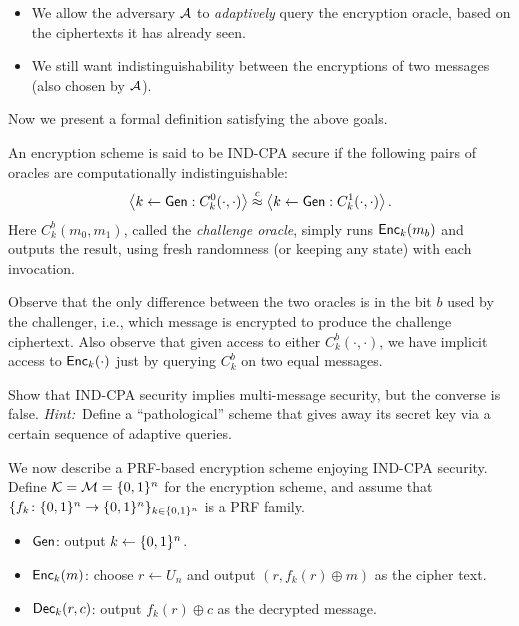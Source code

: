 \documentclass[11pt]{article}
\begin{document}
\begin{itemize}
\item We allow the adversary $\mathcal{A}$ to \emph{adaptively} query the
  encryption oracle, based on the ciphertexts it has already seen.
\item We still want indistinguishability between the encryptions of
  two messages (also chosen by $\mathcal{A}$).
\end{itemize}

Now we present a formal definition satisfying the above goals.

\begin{definition}
  \label{def:ind-cpa}
  An encryption scheme is said to be IND-CPA secure if the following
  pairs of oracles are computationally indistinguishable:
  \[ \left\langle k \gets \mathsf{Gen} : C^0_k(\cdot, \cdot) \right\rangle
  \stackrel{c}{\approx} \left\langle k \gets \mathsf{Gen} : C^1_k(\cdot, \cdot)
  \right\rangle. \] Here $C^{b}_{k}(m_{0}, m_{1})$, called the
  \emph{challenge oracle}, simply runs $\mathsf{Enc}_{k}(m_{b})$ and
  outputs the result, using fresh randomness (or keeping any state)
  with each invocation.
\end{definition}

Observe that the only difference between the two oracles is in the bit
$b$ used by the challenger, i.e., which message is encrypted to
produce the challenge ciphertext.  Also observe that given access to
either $C^{b}_{k}(\cdot,\cdot)$, we have implicit access to
$\mathsf{Enc}_{k}(\cdot)$ just by querying $C^{b}_{k}$ on two equal
messages.

\begin{question}
  Show that IND-CPA security implies multi-message security, but the
  converse is false.  \textit{Hint:}~Define a ``pathological'' scheme
  that gives away its secret key via a certain sequence of adaptive
  queries.
\end{question}

We now describe a PRF-based encryption scheme enjoying IND-CPA
security.  Define $\mathcal{K} = \mathcal{M} = \{0,1\}^{n}$ for the
encryption scheme, and assume that $\{f_{k} \colon \{0,1\}^{n} \to
  \{0,1\}^{n}\}_{k \in \{0,1\}^{n}}$ is a PRF family.
\begin{itemize}
\item $\mathsf{Gen}$: output $k \gets \{0,1\}^n$.
\item $\mathsf{Enc}_k(m)$: choose $r \gets U_n$ and output $(r, f_k(r)
  \oplus m)$ as the cipher text.
\item $\mathsf{Dec}_k(r,c)$: output $f_k(r) \oplus c$ as the decrypted
  message.
\end{itemize}
\end{document}
